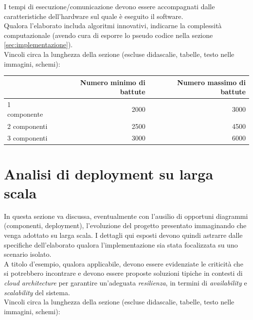 \documentclass[12pt]{article}
\begin{document}
I tempi di esecuzione/comunicazione devono essere accompagnati dalle caratteristiche dell'hardware sul quale è eseguito il software.\\

Qualora l'elaborato includa algoritmi innovativi, indicarne la complessità computazionale (avendo cura di esporre lo pseudo codice nella sezione \ref{sec:implementazione}).\\


Vincoli circa la lunghezza della sezione (escluse didascalie, tabelle, testo nelle immagini, schemi):

\vspace{1cm}
\begin{tabular}{l|rr}
 & Numero minimo di battute & Numero massimo di battute \\
 \hline
 1 componente & 2000 & 3000 \\
 2 componenti & 2500 & 4500 \\
 3 componenti & 3000 & 6000 \\
 \hline
\end{tabular}
\fi

\newpage



\section{Analisi di deployment su larga scala}

In questa sezione va discussa, eventualmente con l'ausilio di opportuni diagrammi (componenti, deployment), l'evoluzione del progetto presentato immaginando che venga adottato su larga scala. I dettagli qui esposti devono quindi astrarre dalle specifiche dell'elaborato qualora l'implementazione sia stata focalizzata su uno scenario isolato.\\

A titolo d’esempio, qualora applicabile, devono essere evidenziate le criticità che si potrebbero incontrare e devono essere proposte soluzioni tipiche in contesti di \textit{cloud architecture} per garantire un'adeguata \textit{resilienza}, in termini di \textit{availability} e \textit{scalability} del sistema.\\


Vincoli circa la lunghezza della sezione (escluse didascalie, tabelle, testo nelle immagini, schemi):
\end{document}
